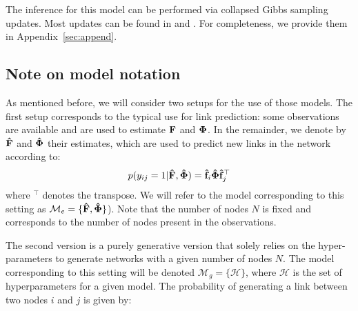 The inference for this model can be performed via collapsed Gibbs sampling updates. Most updates can be found in \cite{HDP} and \cite{diMMSB}. For completeness, we provide them in Appendix~\ref{sec:append}.

\subsection{Note on model notation}
As mentioned before, we will consider two setups for the use of those models. The first setup corresponds to the typical use for link prediction: some observations are available and are used to estimate $\mathbf{F}$ and $\mathbf{\Phi}$. In the remainder, we denote by $\mathbf{\hat{F}}$ and $\mathbf{\hat{\Phi}}$ their estimates, which are used to predict new links in the network according to:
%
\begin{equation}
\label{eq:link-me}
\pr(y_{ij}=1|\mat{\hat{F}},\mat{\hat{\Phi}}) =  \mat{\hat{f}}_{i} \mat{\hat{\Phi}} \mat{\hat{f}}_j^\top
\end{equation}
%
where $^\top$ denotes the transpose. We will refer to the model corresponding to this setting as $\mathcal{M}_e = \{\mathbf{\hat{F}},\mathbf{\hat{\Phi}}\}$). Note that the number of nodes $N$ is fixed and corresponds to the number of nodes present in the observations.

The second version is a purely generative version that solely relies on the hyper-parameters to generate networks with a given number of nodes $N$. The model corresponding to this setting will be denoted $\mathcal{M}_g = \{\mathcal H\}$, where $\mathcal{H}$ is the set of hyperparameters for a given model. The probability of generating a link between  two nodes $i$ and $j$ is given by:
%

